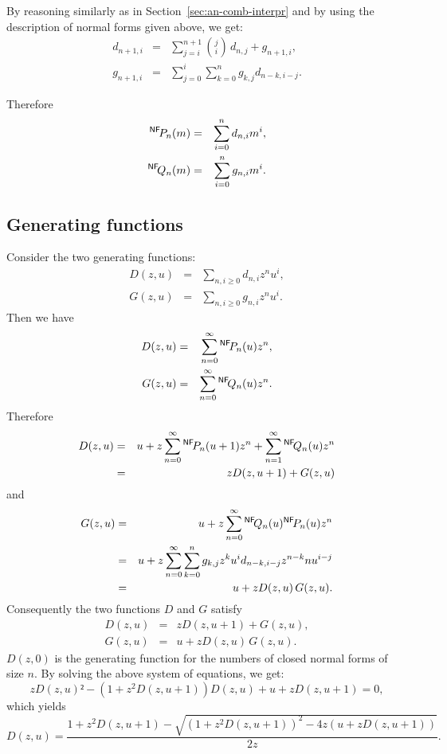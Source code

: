 \documentclass{jfp1}
\newcommand{\PNF}{{}^{\tiny \textsf{NF}}\!P}
\newcommand{\QNF}{{}^{\tiny \textsf{NF}}\!Q}
\begin{document}
By reasoning similarly as in Section~\ref{sec:an-comb-interpr} and by using the
description of normal forms given above, we get:
\begin{eqnarray*}
  d_{n+1,i} &=&  \sum_{j=i}^{n+1} {j \choose i}\,d_{n,j} + g_{n+1,i}, \\
  g_{n+1,i} &=& \sum_{j=0}^i\sum_{k=0}^n g_{k,j} d_{n-k,i-j}.
\end{eqnarray*}

Therefore 
\begin{eqnarray*}
\PNF_n(m)  &=& \sum_{i=0}^n d_{n,i} m^i,\\
\QNF_n(m)  &=&  \sum_{i=0}^n g_{n,i} m^i.
\end{eqnarray*}

\subsection{Generating functions}
\label{sec:D_and_G}
Consider the two generating functions:
\begin{eqnarray*}
  D(z,u) &=& \sum_{n,i\ge 0}d_{n,i}z^n u^i,\\
  G(z,u) &=& \sum_{n,i\ge 0}g_{n,i}z^n u^i.
\end{eqnarray*}
Then we have
\begin{eqnarray*}
  D(z,u) &=& \sum_{n=0}^{\infty}\PNF_n(u) z^n,\\
  G(z,u) &=& \sum_{n=0}^{\infty}\QNF_n(u) z^n.
\end{eqnarray*}
Therefore
\begin{eqnarray*}
  D(z,u) &=& u + z \sum_{n=0}^{\infty} \PNF_n(u+1) z^n +  \sum_{n=1}^{\infty}
  \QNF_n(u) z^n\\
  &=& z D(z,u+1) + G(z,u)
\end{eqnarray*}
and
\begin{eqnarray*}
  G(z,u) &=& u + z \sum_{n=0}^{\infty} \QNF_n(u) \PNF_n(u) z^n\\
  &=& u + z \sum_{n=0}^{\infty} \sum_{k=0}^n g_{k,j} z^{k} u^i d_{n-k,i-j} z^{n-k}n u^{i-j}\\
  &=& u + z D(z,u)\, G(z,u).
\end{eqnarray*}
Consequently the two functions $D$ and $G$ satisfy 
\begin{eqnarray*}
    D(z,u) &=& z D(z,u+1) + G(z,u),\\
    G(z,u) &=& u + zD(z,u)\, G(z,u).
\end{eqnarray*}
$D(z,0)$ is the generating function for the numbers of closed normal forms of size
$n$.
By solving the above system of equations, we get:
\begin{displaymath}
  z D(z,u)² - (1+z^2 D(z,u+1)) D(z,u)  + u + z D(z,u+1) = 0,
\end{displaymath}
which yields
\begin{displaymath}
  D(z,u) = \frac{1 + z^2 D(z,u+1) - \sqrt{(1+z^2 D(z,u+1))^2 - 4z (u +z D(z,u+1))}}{2z}.
\end{displaymath}
\end{document}
